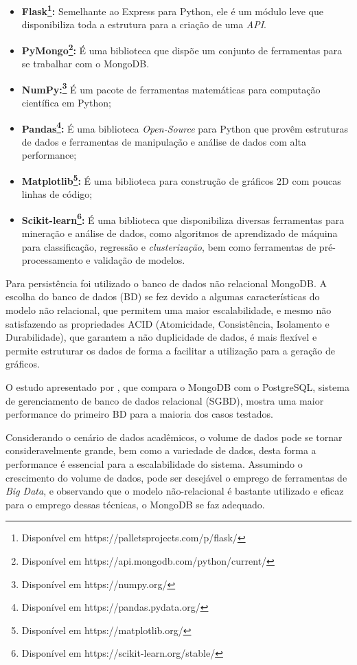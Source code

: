 \begin{itemize}[topsep=5pt]
    \item \textbf{Flask\footnote{Disponível em https://palletsprojects.com/p/flask/}:} Semelhante ao Express para Python, ele é um módulo leve que disponibiliza toda a estrutura para a criação de uma \textit{API}.
    \item \textbf{PyMongo\footnote{Disponível em https://api.mongodb.com/python/current/}:} É uma biblioteca que dispõe um conjunto de ferramentas para se trabalhar com o MongoDB.
    \item \textbf{NumPy:\footnote{Disponível em https://numpy.org/}} É um pacote de ferramentas matemáticas para computação científica em Python;
    \item \textbf{Pandas\footnote{Disponível em https://pandas.pydata.org/}:} É uma biblioteca \textit{Open-Source} para Python que provêm estruturas de dados e ferramentas de manipulação e análise de dados com alta performance;
    \item \textbf{Matplotlib\footnote{Disponível em https://matplotlib.org/}:} É uma biblioteca para construção de gráficos 2D com poucas linhas de código; 
    \item \textbf{Scikit-learn\footnote{Disponível em https://scikit-learn.org/stable/}:} É uma biblioteca que disponibiliza diversas ferramentas para mineração e análise de dados, como algoritmos de aprendizado de máquina para classificação, regressão e \textit{clusterização}, bem como ferramentas de pré-processamento e validação de modelos.
\end{itemize}

Para persistência foi utilizado o banco de dados não relacional MongoDB.
A escolha do banco de dados (BD) se fez devido a algumas características do modelo não relacional, que permitem uma maior escalabilidade, e mesmo não satisfazendo as propriedades ACID (Atomicidade, Consistência, Isolamento e Durabilidade), que garantem a não duplicidade de dados, é mais flexível e permite estruturar os dados de forma a facilitar a utilização para a geração de gráficos.

O estudo apresentado por , que compara o MongoDB com o PostgreSQL, sistema de gerenciamento de banco de dados relacional (SGBD), mostra uma maior performance do primeiro BD para a maioria dos casos testados. 

Considerando o cenário de dados acadêmicos, o volume de dados pode se tornar consideravelmente grande, bem como a variedade de dados, desta forma a performance é essencial para a escalabilidade do sistema. Assumindo o crescimento do volume de dados, pode ser desejável o emprego de ferramentas de \textit{Big Data}, e observando que o modelo não-relacional é bastante utilizado e eficaz para o emprego dessas técnicas, o MongoDB se faz adequado.

